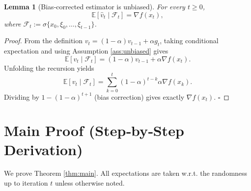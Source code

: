 \documentclass{article}
\newtheorem{lemma}{Lemma}
\newcommand{\E}{\mathbb{E}}
\newcommand{\grad}{\nabla}
\begin{document}
\begin{lemma}[Bias‑corrected estimator is unbiased]\label{lem:unbiased}
For every $t\ge0$,
\[
\E[\hat v_t\mid\mathcal{F}_t]=\grad f(x_t),
\]
where $\mathcal{F}_t:=\sigma\{x_0,\xi_0,\dots,\xi_{t-1}\}$.
\end{lemma}
\begin{proof}
From the definition $v_t=(1-\alpha)v_{t-1}+\alpha g_t$,
taking conditional expectation and using Assumption \ref{ass:unbiased} gives
\[
\E[v_t\mid\mathcal{F}_t]=(1-\alpha)v_{t-1}+\alpha\grad f(x_t).
\]
Unfolding the recursion yields
\[
\E[v_t\mid\mathcal{F}_t]=\sum_{k=0}^{t}(1-\alpha)^{t-k}\alpha\grad f(x_k).
\]
Dividing by $1-(1-\alpha)^{t+1}$ (bias correction) gives exactly $\grad f(x_t)$. \hfill $\square$
\end{proof}

\section*{Main Proof (Step‑by‑Step Derivation)}
We prove Theorem \ref{thm:main}.  
All expectations are taken w.r.t. the randomness up to iteration $t$ unless otherwise noted.
\end{document}
